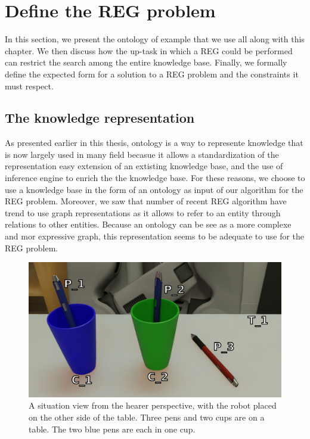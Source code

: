 \section{Define the REG problem}

In this section, we present the ontology of example that we use all along with this chapter. We then discuss how the up-task in which a REG could be performed can restrict the search among the entire knowledge base. Finally, we formally define the expected form for a solution to a REG problem and the constraints it must respect.


\subsection{The knowledge representation}

As presented earlier in this thesis, ontology is a way to represente knowledge that is now largely used in many field becasue it allows a standardization of the representation easy extension of an extisting knowledge base, and the use of inference engine to enrich the the knowledge base. For these reasons, we choose to use a knowledge base in the form of an ontology as input of our algorithm for the REG problem. Moreover, we saw that number of recent REG algorithm have trend to use graph representations as it allows to refer to an entity through relations to other entities. Because an ontology can be see as a more complexe and mor expressive graph, this representation seems to be adequate to use for the REG problem. 

\begin{figure}[h!]
\centering
\includegraphics[scale=0.2]{figures/chapter4/pens.png}
\caption{\label{fig:chap4_kb} A situation view from the hearer perspective, with the robot placed on the other side of the table. Three pens and two cups are on a table. The two blue pens are each in one cup. }
\end{figure}

